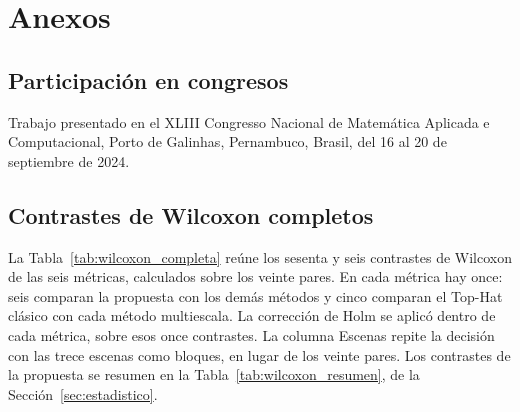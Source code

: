 \chapter*{Anexos}
{}

\setcounter{table}{0}
\setcounter{figure}{0}

\section*{Participación en congresos}

{\setlength{\leftskip}{1cm}\noindent{}\par}
{\setlength{\leftskip}{1cm}\noindent Trabajo presentado en el XLIII Congresso Nacional de Matemática Aplicada
e Computacional, Porto de Galinhas, Pernambuco, Brasil, del 16 al 20 de septiembre de 2024.\par}

\clearpage
\section*{Contrastes de Wilcoxon completos}

La Tabla~\ref{tab:wilcoxon_completa} reúne los sesenta y seis contrastes de Wilcoxon de las seis métricas,
calculados sobre los veinte pares. En cada métrica hay once: seis comparan la propuesta con los demás
métodos y cinco comparan el Top-Hat clásico con cada método multiescala. La corrección de Holm se aplicó
dentro de cada métrica, sobre esos once contrastes. La columna Escenas repite la decisión con las trece
escenas como bloques, en lugar de los veinte pares. Los contrastes de la propuesta se resumen en la
Tabla~\ref{tab:wilcoxon_resumen}, de la Sección~\ref{sec:estadistico}.


